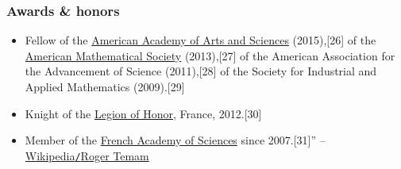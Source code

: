 \documentclass{article}
\begin{document}
\subsubsection{Awards \& honors}
\begin{itemize}
	\item Fellow of the \href{https://en.wikipedia.org/wiki/American_Academy_of_Arts_and_Sciences}{American Academy of Arts and Sciences} (2015),[26] of the \href{https://en.wikipedia.org/wiki/American_Mathematical_Society}{American Mathematical Society} (2013),[27] of the American Association for the Advancement of Science (2011),[28] of the Society for Industrial and Applied Mathematics (2009).[29]
	\item Knight of the \href{https://en.wikipedia.org/wiki/Legion_of_Honour}{Legion of Honor}, France, 2012.[30]
	\item Member of the \href{https://en.wikipedia.org/wiki/French_Academy_of_Sciences}{French Academy of Sciences} since 2007.[31]'' -- \href{https://en.wikipedia.org/wiki/Roger_Temam}{Wikipedia{\tt/}Roger Temam}
\end{itemize}

\end{document}
